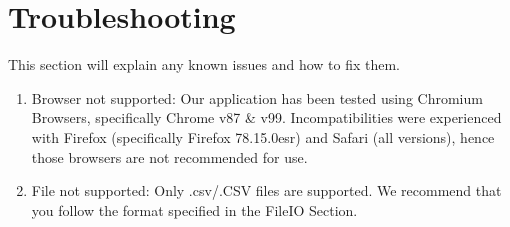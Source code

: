 \section{Troubleshooting}
This section will explain any known issues and how to fix them.

\begin{enumerate}
\item Browser not supported: Our application has been tested using Chromium Browsers, specifically Chrome v87 \& v99. Incompatibilities were experienced with Firefox (specifically Firefox 78.15.0esr) and Safari (all versions), hence those browsers are not recommended for use. 
\item File not supported: Only .csv/.CSV files are supported. We recommend that you follow the format specified in the FileIO Section.
\end{enumerate}
